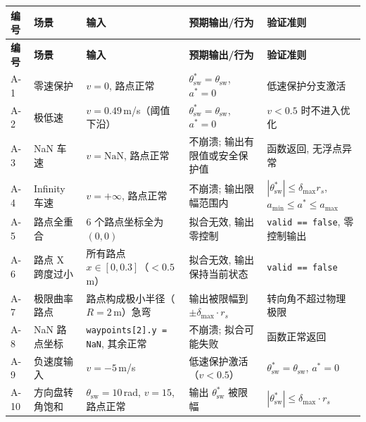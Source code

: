 \documentclass[a4paper,10pt]{article}
\begin{document}
{\small
\begin{longtable}{|C{0.6cm}|L{2.0cm}|L{4.5cm}|L{4.2cm}|L{3.8cm}|}
\hline
\textbf{编号} & \textbf{场景} & \textbf{输入} & \textbf{预期输出/行为} & \textbf{验证准则} \\
\hline
\endfirsthead
\hline
\textbf{编号} & \textbf{场景} & \textbf{输入} & \textbf{预期输出/行为} & \textbf{验证准则} \\
\hline
\endhead
A-1 &
零速保护 &
$v{=}0$, 路点正常 &
$\theta_{\text{sw}}^* = \theta_{\text{sw}}$, $a^*{=}0$ &
低速保护分支激活 \\
\hline
A-2 &
极低速 &
$v{=}0.49$\,m/s（阈值下沿） &
$\theta_{\text{sw}}^* = \theta_{\text{sw}}$, $a^*{=}0$ &
$v < 0.5$ 时不进入优化 \\
\hline
A-3 &
NaN 车速 &
$v{=}\text{NaN}$, 路点正常 &
不崩溃; 输出有限值或安全保护值 &
函数返回, 无浮点异常 \\
\hline
A-4 &
Infinity 车速 &
$v{=}+\infty$, 路点正常 &
不崩溃; 输出限幅范围内 &
$|\theta_{\text{sw}}^*| \leq \delta_{\max} r_s$, $a_{\min} \leq a^* \leq a_{\max}$ \\
\hline
A-5 &
路点全重合 &
6 个路点坐标全为 $(0,0)$ &
拟合无效, 输出零控制 &
\texttt{valid == false}, 零控制输出 \\
\hline
A-6 &
路点 X 跨度过小 &
所有路点 $x \in [0, 0.3]$（$< 0.5$\,m） &
拟合无效, 输出保持当前状态 &
\texttt{valid == false} \\
\hline
A-7 &
极限曲率路点 &
路点构成极小半径（$R{=}2$\,m）急弯 &
输出被限幅到 $\pm\delta_{\max} \cdot r_s$ &
转向角不超过物理极限 \\
\hline
A-8 &
NaN 路点坐标 &
\texttt{waypoints[2].y = NaN}, 其余正常 &
不崩溃; 拟合可能失败 &
函数正常返回 \\
\hline
A-9 &
负速度输入 &
$v{=}{-}5$\,m/s &
低速保护激活（$v < 0.5$） &
$\theta_{\text{sw}}^* = \theta_{\text{sw}}$, $a^*{=}0$ \\
\hline
A-10 &
方向盘转角饱和 &
$\theta_{\text{sw}}{=}10$\,rad, $v{=}15$, 路点正常 &
输出 $\theta_{\text{sw}}^*$ 被限幅 &
$|\theta_{\text{sw}}^*| \leq \delta_{\max} \cdot r_s$ \\
\hline
\end{longtable}
}
\end{document}

